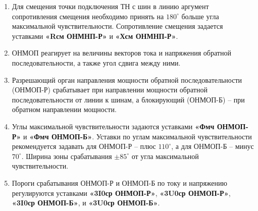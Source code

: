 \begin{enumerate}[label=\arabic{section}.\arabic{subsection}.\arabic{enumi}, labelsep=4pt, leftmargin=0pt, itemindent=57pt, itemsep=0pt, parsep=5pt]
\begin{enumerate}[label=\arabic{section}.\arabic{subsection}.\arabic{enumi}.\arabic*, labelsep=4pt, leftmargin=0em, itemindent=65pt, parsep=0pt]
\begin{equation}
\label{eq:3U}
3\vec U_{0\textsl{ ОНМНП}} = 3\vec U_{0\textsl{ КЗ}} + 3\vec U_{0\textsl{ см}} = 3\vec U_{0\textsl{ КЗ}} + 3 \vec I_{0 \textsl{ КЗ}} \cdot \vec{Z}_{0\textsl{ см}}
\end{equation}

\item
Для смещения точки подключения ТН с шин в линию аргумент сопротивления смещения необходимо принять на $180^\circ$ больше угла максимальной чувствительности. Сопротивление смещения задается уставками \textbf{«Rсм ОНМНП-Р»} и \textbf{«Хсм ОНМНП-Р»}.

\item
ОНМОП реагирует на величины векторов тока и напряжения обратной последовательности, а также угол сдвига между ними.

\item
Разрешающий орган направления мощности обратной последовательности (ОНМОП-Р) срабатывает при направлении мощности обратной последовательности от линии к шинам, а блокирующий (ОНМОП-Б) -- при обратном направлении мощности. 

\item
Углы максимальной чувствительности задаются уставками \textbf{«Фмч ОНМОП-Р»} и \textbf{«Фмч ОНМОП-Б»}. Уставки по углам максимальной чувствительности рекомендуется задавать для ОНМОП-Р -- плюс $110^\circ$, а для ОНМОП-Б -- минус $70^\circ$. Ширина зоны срабатывания $\pm 85^\circ$ от угла максимальной чувствительности.

\item
Пороги срабатывания ОНМОП-Р и ОНМОП-Б по току и напряжению регулируются уставками \textbf{«3I0ср ОНМОП-Р»}, \textbf{«3U0ср ОНМОП-Р»}, \textbf{«3I0ср ОНМОП-Б»}, и \textbf{«3U0ср ОНМОП-Б»}.


\end{enumerate}
\end{enumerate}
